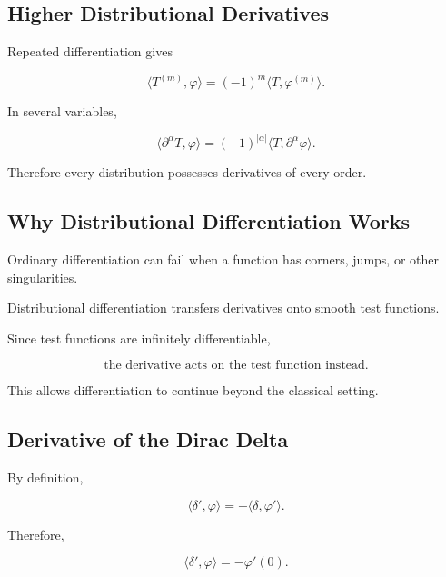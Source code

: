 \subsection{Higher Distributional Derivatives}
\label{subsec:higher-distributional-derivatives}

Repeated differentiation gives

\[
\boxed{
\langle T^{(m)},\varphi\rangle
=
(-1)^m
\langle T,\varphi^{(m)}\rangle.
}
\]

In several variables,

\[
\boxed{
\langle
\partial^\alpha T,
\varphi
\rangle
=
(-1)^{|\alpha|}
\langle
T,
\partial^\alpha\varphi
\rangle.
}
\]

Therefore every distribution possesses derivatives of every order.

\subsection{Why Distributional Differentiation Works}
\label{subsec:why-distributional-differentiation}

Ordinary differentiation can fail when a function has corners, jumps,
or other singularities.

Distributional differentiation transfers derivatives onto smooth test
functions.

Since test functions are infinitely differentiable,

\[
\boxed{
\text{the derivative acts on the test function instead}.
}
\]

This allows differentiation to continue beyond the classical setting.

\subsection{Derivative of the Dirac Delta}
\label{subsec:delta-derivative}

By definition,

\[
\langle\delta',\varphi\rangle
=
-
\langle\delta,\varphi'\rangle.
\]

Therefore,

\[
\boxed{
\langle\delta',\varphi\rangle
=
-\varphi'(0).
}
\]

